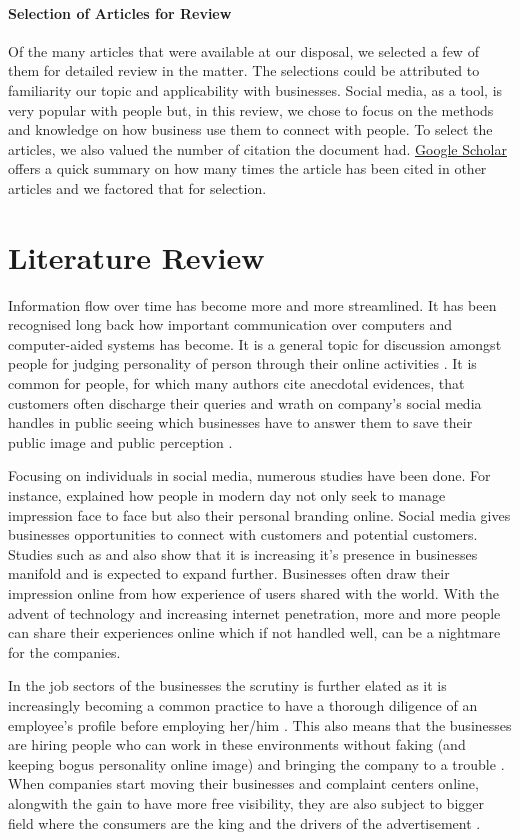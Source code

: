 \documentclass[12pt]{article}
\begin{document}
\paragraph{Selection of Articles for Review}
Of the many articles that were available at our disposal, we selected a few of them for detailed review in the matter. The selections could be attributed to familiarity our topic and applicability with businesses. Social media, as a tool, is very popular with people but, in this review, we chose to focus on the methods and knowledge on how business use them to connect with people. To select the articles, we also valued the number of citation the document had. \href{https://scholar.google.co.in/}{Google Scholar} offers a quick summary on how many times the article has been cited in other articles and we factored that for selection.

\section{Literature Review}
Information flow over time has become more and more streamlined. It has been recognised long back how important communication over computers and computer-aided systems has become. It is a general topic for discussion amongst people for judging personality of person through their online activities \citep{walther2009}. It is common for people, for which many authors cite anecdotal evidences, that customers often discharge their queries and wrath on company's social media handles in public seeing which businesses have to answer them to save their public image and public perception \citep{mangold2009}.

Focusing on individuals in social media, numerous studies have been done. For instance, \cite{zhao2008} explained how people in modern day not only seek to manage impression face to face but also their personal branding online. Social media gives businesses opportunities to connect with customers and potential customers. Studies such as \cite{madera2012} and \cite{bohnert2010} also show that it is increasing it's presence in businesses manifold and is expected to expand further. Businesses often draw their impression online from how experience of users shared with the world. With the advent of technology and increasing internet penetration, more and more people can share their experiences online which if not handled well, can be a nightmare for the companies. \citep{schwartz2000}

In the job sectors of the businesses the scrutiny is further elated as it is increasingly becoming a common practice to have a thorough diligence of an employee's profile before employing her/him \citep{dekay2009}. This also means that the businesses are hiring people who can work in these environments without faking (and keeping bogus personality online image) and bringing the company to a trouble \citep{westerman2008}. When companies start moving their businesses and complaint centers online, alongwith the gain to have more free visibility, they are also subject to bigger field where the consumers are the king and the drivers of the advertisement \citep{schwartz2000}. 
\end{document}
